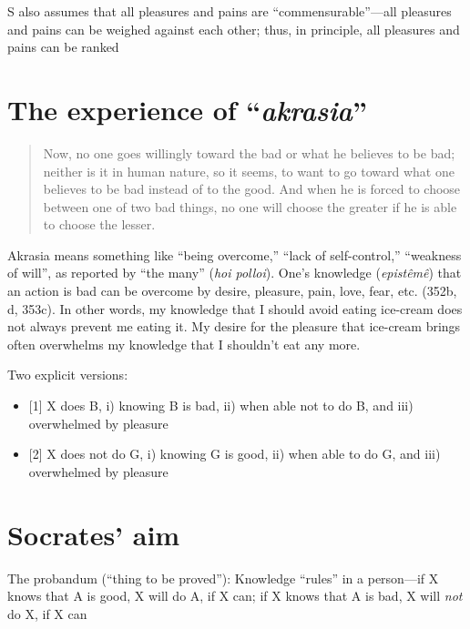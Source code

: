\documentclass[oneside]{article}
\begin{document}
\vspace*{2mm}

\noindent S also assumes that all pleasures and pains are ``commensurable''---all pleasures and pains can be weighed against each other; thus, in principle, all pleasures and pains can be ranked

\section*{The experience of ``\emph{akrasia}''}
\begin{quote} Now, no one goes willingly toward the bad or what he believes to be bad; neither is it in human nature, so it seems, to want to go toward what one believes to be bad instead of to the good. And when he is forced to choose between one of two bad things, no one will choose the greater if he is able to choose the lesser. \end{quote}

Akrasia means something like ``being overcome,'' ``lack of self-control,'' ``weakness of will'', as reported by ``the many'' (\emph{hoi polloi}). One's knowledge (\emph{epist\^{e}m\^{e}}) that an action is bad can be overcome by desire, pleasure, pain, love, fear, etc. (352b, d, 353c). In other words, my knowledge that I should avoid eating ice-cream does not always prevent me eating it. My desire for the pleasure that ice-cream brings often overwhelms my knowledge that I shouldn't eat any more. 

\vspace*{2mm}

\noindent Two explicit versions:

\begin{itemize}\item{[1] X does B, i) knowing B is bad, ii) when able not to do B, and iii) overwhelmed by pleasure}
\item{[2] X does not do G, i) knowing G is good, ii) when able to do G, and iii) overwhelmed by pleasure}\end{itemize}

\section*{Socrates' aim}

\noindent The probandum (``thing to be proved''): Knowledge ``rules'' in a person---if X knows that A is good, X will do A, if X can; if X knows that A is bad, X will \emph{not} do X, if X can
\end{document}
